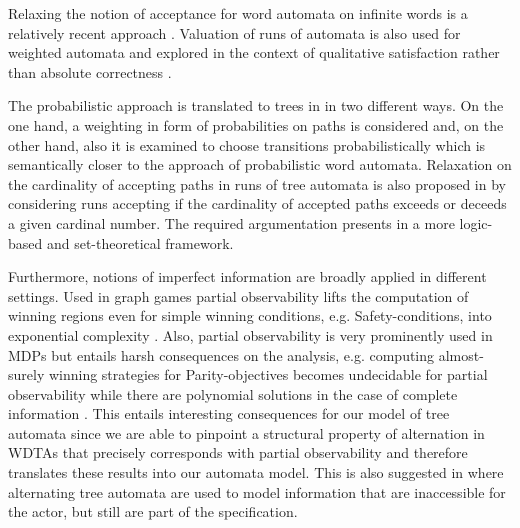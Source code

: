 Relaxing the notion of acceptance for word automata on infinite words is a
relatively recent approach \cite{PBAcoin,Groesser,RecOmeLangProbAuto,%
DecProblemsForProbAuto}. Valuation of runs of automata is also used for
weighted automata \cite{MaxSumSemanticsWeightedAutomata} and explored in the
context of qualitative satisfaction rather than absolute correctness
\cite{DecWeightedAutomata}.

The probabilistic approach is translated to trees in \cite{RandAutoInfTrees,%
QualTreeLang} in two different ways. On the one hand, a weighting in form of
probabilities on paths is considered and, on the other hand, also it is
examined to choose transitions probabilistically which is semantically closer
to the approach of probabilistic word automata. Relaxation on the cardinality
of accepting paths in runs of tree automata is also proposed in
\cite{CardinalsForTreePaths} by considering runs accepting if the cardinality
of accepted paths exceeds or deceeds a given cardinal number. The required
argumentation presents in a more logic-based and set-theoretical framework.

Furthermore, notions of imperfect information are broadly applied in different
settings. Used in graph games partial observability lifts the computation of
winning regions even for simple winning conditions, e.g. Safety-conditions,
into exponential complexity \cite{PowerOfImperfectInformation}. Also, partial
observability is very prominently used in \aclp*{MDP} \cite{RandomnessForFree,%
ActingOptimallyInPOSD, QualAnaPOMDP} but entails harsh consequences on the
analysis, e.g. computing almost-surely winning strategies for Parity-objectives
becomes undecidable for partial observability while there are polynomial
solutions in the case of complete information \cite{QualAnaPOMDP,%
QuanStochParityGames}. This entails interesting consequences for our model of
tree automata since we are able to pinpoint a structural property of
alternation in \aclp*{WDTA} that precisely corresponds with partial
observability and therefore translates these results into our automata model.
This is also suggested in \cite{ChurchsProblemRevisited} where alternating tree
automata are used to model information that are inaccessible for the actor, but
still are part of the specification.


